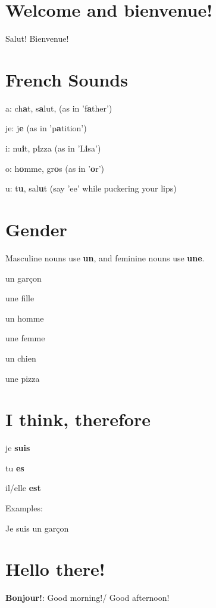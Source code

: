 \documentclass[a4paper,10pt]{article}
\begin{document}

\section{Welcome and bienvenue!}

Salut! Bienvenue!

\section{French Sounds}


a: ch\textbf{a}t, s\textbf{a}lut, (as in 'f\textbf{a}ther')


je: j\textbf{e} (as in 'p\textbf{a}tition')


i: nu\textbf{i}t, p\textbf{i}zza (as in 'L\textbf{i}sa')


o: h\textbf{o}mme, gr\textbf{o}s (as in '\textbf{o}r')


u: t\textbf{u}, sal\textbf{u}t (say 'ee' while puckering your lips)

\section{Gender}
Masculine nouns use \textbf{un}, and feminine nouns use \textbf{une}.


un garçon


une fille


un homme


une femme


un chien


une pizza

\section{I think, therefore}


je \textbf{suis}


tu \textbf{es}


il/elle \textbf{est}


Examples:


Je suis un garçon

\section{Hello there!}


\textbf{Bonjour!}: Good morning!/ Good afternoon!
\end{document}
